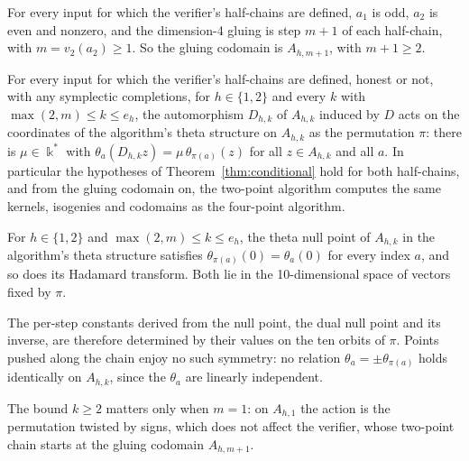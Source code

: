 \documentclass[version=preprint]{iacrcc}
\begin{document}
    \begin{lemma}
        \label{lem:gluing}
        For every input for which the verifier's half-chains are defined, $a_1$ is
        odd, $a_2$ is even and nonzero, and the dimension-4 gluing is step $m +
        1$ of each half-chain, with $m = v_2(a_2) \ge 1$. So the gluing codomain
        is $A_{h, m+1}$, with $m + 1 \ge 2$.
    \end{lemma}




    \begin{theorem}
        \label{thm:base}
        For every input for which the verifier's half-chains are defined, honest
        or not, with any symplectic completions, for $h \in \{1, 2\}$ and every
        $k$ with $\max(2, m) \le k \le e_h$, the automorphism $D_{h,k}$ of $A_{h,k}$
        induced by $D$ acts on the coordinates of the algorithm's theta structure
        on $A_{h,k}$ as the permutation $\pi$: there is $\mu \in \Bbbk^*$ with
        $\theta_a(D_{h,k} z) = \mu\, \theta_{\pi(a)}(z)$ for all $z \in A_{h,k}$
        and all $a$. In particular the hypotheses of
        Theorem~\ref{thm:conditional} hold for both half-chains, and from the
        gluing codomain on, the two-point algorithm computes the same kernels,
        isogenies and codomains as the four-point algorithm.
    \end{theorem}


    \begin{proposition}
        \label{prop:symnull}
        For $h \in \{1, 2\}$ and $\max(2, m) \le k \le e_h$, the theta null point
        of $A_{h,k}$ in the algorithm's theta structure satisfies $\theta_{\pi(a)}(0)
        = \theta_a(0)$ for every index $a$, and so does its Hadamard transform.
        Both lie in the 10-dimensional space of vectors fixed by $\pi$.
    \end{proposition}


    The per-step constants derived from the null point, the dual null point
    and its inverse, are therefore determined by their values on the ten
    orbits of $\pi$. Points pushed along the chain enjoy no such symmetry: no
    relation $\theta_a = \pm \theta_{\pi(a)}$ holds identically on $A_{h,k}$,
    since the $\theta_a$ are linearly independent.

    The bound $k \ge 2$ matters only when $m = 1$: on $A_{h,1}$ the action is
    the permutation twisted by signs, which does not affect the verifier,
    whose two-point chain starts at the gluing codomain $A_{h, m+1}$.
\end{document}
